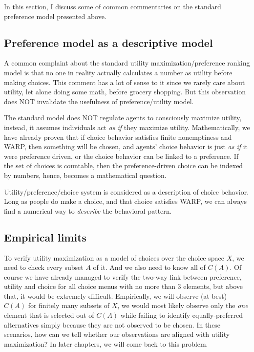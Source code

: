 In this section, I discuss some of common commentaries on the standard preference model presented above.

\subsection*{Preference model as a descriptive model}
A common complaint about the standard utility maximization/preference ranking model is that no one in reality actually calculates a number as utility before making choices.
This comment has a lot of sense to it since we rarely care about utility, let alone doing some math, before grocery shopping. But this observation does NOT invalidate the 
usefulness of preference/utility model.

The standard model does NOT regulate agents to consciously maximize utility, instead, it assumes individuals act \textit{as if} they maximize utility. Mathematically, we have already
proven that if choice behavior satisfies finite nonemptiness and WARP, then something will be chosen, and agents' choice behavior is just \textit{as if} it were preference driven, or the choice
behavior can be linked to a preference. If the set of choices is countable, then the preference-driven choice can be indexed by numbers, hence, becomes a mathematical question.

Utility/preference/choice system is considered as a description of choice behavior. Long as people do make a choice, and that choice satisfies WARP, we can always find a numerical way to 
\textit{describe} the behavioral pattern.

\subsection*{Empirical limits}
To verify utility maximization as a model of choices over the choice space $X$, we need to check every subset $A$ of it. And we also need to know all of $C(A)$. Of course we have already managed to verify the two-way link between
preference, utility and choice for all choice menus with no more than 3 elements, but above that, it would be extremely difficult. Empirically, we will observe (at best) $C(A)$ for finitely many subsets of $X$, we would most likely
observe only the \textit{one} element that is selected out of $C(A)$ while failing to identify equally-preferred alternatives simply because they are not observed to be chosen. In these scenarios, how can we tell whether our observations
are aligned with utility maximization? In later chapters, we will come back to this problem.

